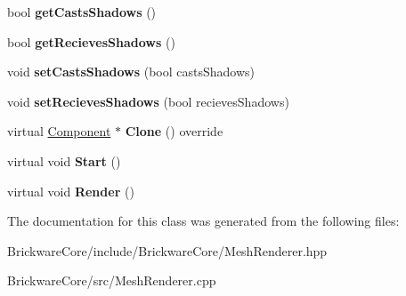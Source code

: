 \begin{DoxyCompactItemize}
\item 
\hypertarget{classBrickware_1_1Core_1_1MeshRenderer_a9ef60b3ee0ccfe89791f6e1075514c81}{}bool {\bfseries get\+Casts\+Shadows} ()\label{classBrickware_1_1Core_1_1MeshRenderer_a9ef60b3ee0ccfe89791f6e1075514c81}

\item 
\hypertarget{classBrickware_1_1Core_1_1MeshRenderer_aab736eb7f23875946f0fe8886f47c178}{}bool {\bfseries get\+Recieves\+Shadows} ()\label{classBrickware_1_1Core_1_1MeshRenderer_aab736eb7f23875946f0fe8886f47c178}

\item 
\hypertarget{classBrickware_1_1Core_1_1MeshRenderer_a2f1a1edae6143b1827c8a7b9c882738e}{}void {\bfseries set\+Casts\+Shadows} (bool casts\+Shadows)\label{classBrickware_1_1Core_1_1MeshRenderer_a2f1a1edae6143b1827c8a7b9c882738e}

\item 
\hypertarget{classBrickware_1_1Core_1_1MeshRenderer_a9e3eab2085349494843469ca70bdbc45}{}void {\bfseries set\+Recieves\+Shadows} (bool recieves\+Shadows)\label{classBrickware_1_1Core_1_1MeshRenderer_a9e3eab2085349494843469ca70bdbc45}

\item 
\hypertarget{classBrickware_1_1Core_1_1MeshRenderer_abe1a723bdfd6d0f1d0d59b39fe90d616}{}virtual \hyperlink{classBrickware_1_1Core_1_1Component}{Component} $\ast$ {\bfseries Clone} () override\label{classBrickware_1_1Core_1_1MeshRenderer_abe1a723bdfd6d0f1d0d59b39fe90d616}

\item 
\hypertarget{classBrickware_1_1Core_1_1MeshRenderer_ae348a324933735cba77709f57eecd991}{}virtual void {\bfseries Start} ()\label{classBrickware_1_1Core_1_1MeshRenderer_ae348a324933735cba77709f57eecd991}

\item 
\hypertarget{classBrickware_1_1Core_1_1MeshRenderer_af2b80c3ca8129cead484f11789d2a1da}{}virtual void {\bfseries Render} ()\label{classBrickware_1_1Core_1_1MeshRenderer_af2b80c3ca8129cead484f11789d2a1da}

\end{DoxyCompactItemize}


The documentation for this class was generated from the following files\+:\begin{DoxyCompactItemize}
\item 
Brickware\+Core/include/\+Brickware\+Core/Mesh\+Renderer.\+hpp\item 
Brickware\+Core/src/Mesh\+Renderer.\+cpp\end{DoxyCompactItemize}
